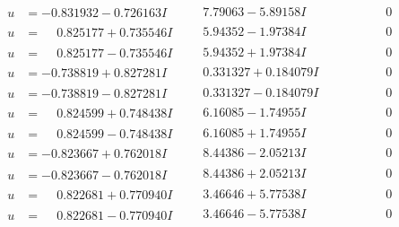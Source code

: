 \documentclass[1p]{elsarticle_modified}
\theoremstyle{definition}
\begin{document}
$$\begin{array}{c|c|c}
\begin{aligned}
u &= -0.831932 - 0.726163 I\end{aligned}
 & \phantom{-}7.79063 - 5.89158 I & \phantom{-0.000000 } 0 \\ \hline\begin{aligned}
u &= \phantom{-}0.825177 + 0.735546 I\end{aligned}
 & \phantom{-}5.94352 - 1.97384 I & \phantom{-0.000000 } 0 \\ \hline\begin{aligned}
u &= \phantom{-}0.825177 - 0.735546 I\end{aligned}
 & \phantom{-}5.94352 + 1.97384 I & \phantom{-0.000000 } 0 \\ \hline\begin{aligned}
u &= -0.738819 + 0.827281 I\end{aligned}
 & \phantom{-}0.331327 + 0.184079 I & \phantom{-0.000000 } 0 \\ \hline\begin{aligned}
u &= -0.738819 - 0.827281 I\end{aligned}
 & \phantom{-}0.331327 - 0.184079 I & \phantom{-0.000000 } 0 \\ \hline\begin{aligned}
u &= \phantom{-}0.824599 + 0.748438 I\end{aligned}
 & \phantom{-}6.16085 - 1.74955 I & \phantom{-0.000000 } 0 \\ \hline\begin{aligned}
u &= \phantom{-}0.824599 - 0.748438 I\end{aligned}
 & \phantom{-}6.16085 + 1.74955 I & \phantom{-0.000000 } 0 \\ \hline\begin{aligned}
u &= -0.823667 + 0.762018 I\end{aligned}
 & \phantom{-}8.44386 - 2.05213 I & \phantom{-0.000000 } 0 \\ \hline\begin{aligned}
u &= -0.823667 - 0.762018 I\end{aligned}
 & \phantom{-}8.44386 + 2.05213 I & \phantom{-0.000000 } 0 \\ \hline\begin{aligned}
u &= \phantom{-}0.822681 + 0.770940 I\end{aligned}
 & \phantom{-}3.46646 + 5.77538 I & \phantom{-0.000000 } 0 \\ \hline\begin{aligned}
u &= \phantom{-}0.822681 - 0.770940 I\end{aligned}
 & \phantom{-}3.46646 - 5.77538 I & \phantom{-0.000000 } 0 \\ \hline\begin{aligned}

\end{aligned}
\end{array}$$
\end{document}
